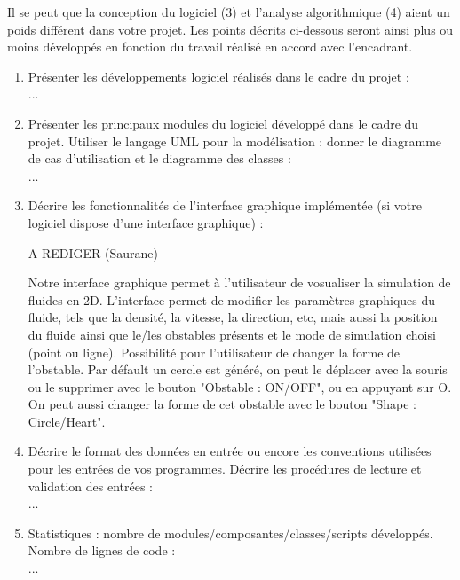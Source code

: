 \documentclass[a4paper]{article}
\begin{document}
Il se peut que la conception du logiciel (3) et l'analyse algorithmique (4) aient un poids 
différent dans votre projet. Les points décrits ci-dessous seront ainsi plus ou moins développés 
en fonction du travail réalisé en accord avec l'encadrant. 
\begin{enumerate}%
\item Présenter les développements logiciel réalisés dans le cadre du projet : \\
...

\item Présenter les principaux modules du logiciel développé dans le cadre du projet. Utiliser 
le langage UML pour la modélisation : donner le diagramme de cas d'utilisation et le diagramme 
des classes : \\
...

\item  Décrire les fonctionnalités de l'interface graphique implémentée (si votre logiciel 
dispose d'une interface graphique) : \\
{\color{red}A REDIGER (Saurane)

Notre interface graphique permet à l'utilisateur de vosualiser la simulation de fluides en 2D. 
L'interface permet de modifier les paramètres graphiques du fluide, tels que la densité, la vitesse, 
la direction, etc, mais aussi la position du fluide ainsi que le/les obstables présents et le mode 
de simulation choisi (point ou ligne).
Possibilité pour l'utilisateur de changer la forme de l'obstable. Par défault un cercle
est généré, on peut le déplacer avec la souris ou le supprimer avec le bouton "Obstable : ON/OFF", ou 
en appuyant sur O. On peut aussi changer la forme de cet obstable avec le bouton "Shape : Circle/Heart".
}

\item Décrire le format des données en entrée ou encore les conventions utilisées pour les entrées 
de vos programmes. Décrire les procédures de lecture et validation des entrées :\\
...

\item Statistiques : nombre de modules/composantes/classes/scripts développés. Nombre de lignes 
de code :\\
...


\end{enumerate}
\end{document}
